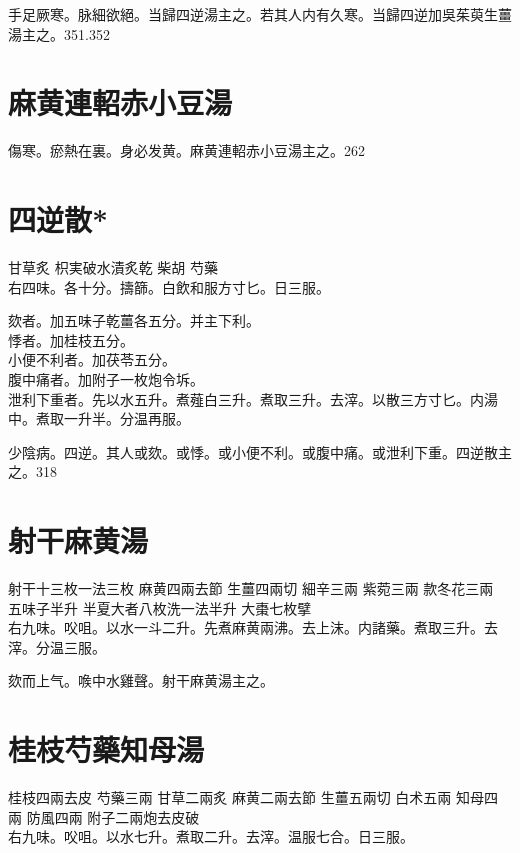 手足厥寒。脉細欲絕。当歸四逆湯主之。若其人内有久寒。当歸四逆加吳茱萸生薑湯主之。351.352

\section{麻黄連軺赤小豆湯}

傷寒。瘀熱在裏。身必发黄。麻黄連軺赤小豆湯主之。262

\section{四逆散*}

甘草{\scriptsize 炙} 枳実{\scriptsize 破水漬炙乾} 柴胡{ }芍藥\\
右四味。各十分。擣篩。白飲和服方寸匕。日三服。 

欬者。加五味子乾薑各五分。并主下利。\\
悸者。加桂枝五分。\\
小便不利者。加茯苓五分。\\
腹中痛者。加附子一枚炮令坼。\\
泄利下重者。先以水五升。煮薤白三升。煮取三升。去滓。以散三方寸匕。内湯中。煮取一升半。分温再服。

少陰病。四逆。其人或欬。或悸。或小便不利。或腹中痛。或泄利下重。四逆散主之。318

\section{射干麻黄湯}

射干{\scriptsize 十三枚一法三枚} 麻黄{\scriptsize 四兩去節} 生薑{\scriptsize 四兩切} 細辛{\scriptsize 三兩} 紫菀{\scriptsize 三兩} 款冬花{\scriptsize 三兩} 五味子{\scriptsize 半升} 半夏{\scriptsize 大者八枚洗一法半升} 大棗{\scriptsize 七枚擘}\\
右九味。㕮咀。以水一斗二升。先煮麻黄兩沸。去上沫。内諸藥。煮取三升。去滓。分温三服。

欬而上气。㗋中水雞聲。射干麻黄湯主之。

\section{桂枝芍藥知母湯}

桂枝{\scriptsize 四兩去皮} 芍藥{\scriptsize 三兩} 甘草{\scriptsize 二兩炙} 麻黄{\scriptsize 二兩去節} 生薑{\scriptsize 五兩切} 白术{\scriptsize 五兩} 知母{\scriptsize 四兩} 防風{\scriptsize 四兩} 附子{\scriptsize 二兩炮去皮破}\\
右九味。㕮咀。以水七升。煮取二升。去滓。温服七合。日三服。

